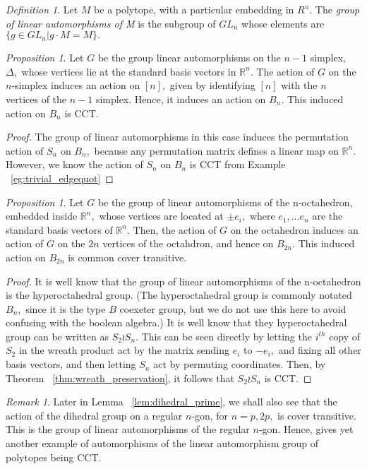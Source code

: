 \documentclass[10 pt]{amsart}
\theoremstyle{plain}
\theoremstyle{definition}
\theoremstyle{remark}
\numberwithin{equation}{section}
\newtheorem{prop}[thm]{Proposition}
\theoremstyle{remark}
\newtheorem{rem}[thm]{Remark}
\newtheorem{defn}[thm]{Definition}
\newcommand\BR{{\mathbb R}}
\begin{document}
\begin{defn}
Let $M$ be a polytope, with a particular embedding in $R^n.$ The {\it group of linear automorphisms of M} is the subgroup of $GL_n$ whose elements are $\{g \in GL_n|g \cdot M = M\}.$
\end{defn}

\begin{prop}
Let $G$ be the group linear automorphisms on the $n-1$ simplex, $\Delta,$ whose vertices lie at the standard basis vectors in $\BR^n.$ The action of $G$ on the $n$-simplex induces an action on $[n],$ given by identifying $[n]$ with the $n$ vertices of the $n-1$ simplex. Hence, it induces an action on $B_n.$ This induced action on $B_n$ is CCT.
\end{prop}
\begin{proof}
The group of linear automorphisms in this case induces the permutation action of $S_n$ on $B_n,$ because any permutation matrix defines a linear map on $\BR^n.$ However, we know the action of $S_n$ on $B_n$ is CCT from Example ~\ref{eg:trivial_edgequot}
\end{proof}

\begin{prop}
Let $G$ be the group of linear automorphisms of the n-octahedron, embedded inside $\BR^n,$ whose vertices are located at $\pm e_i,$ where $e_1,\ldots e_n$ are the standard basis vectors of $\BR^n.$ Then, the action of $G$ on the octahedron induces an action of $G$ on the $2n$ vertices of the octahdron, and hence on $B_{2n}.$ This induced action on $B_{2n}$ is common cover transitive. 
\end{prop}
\begin{proof}
It is well know that the group of linear automorphisms of the n-octahedron is the hyperoctahedral group. (The hyperoctahedral group is commonly notated $B_n,$ since it is the type $B$ coexeter group, but we do not use this here to avoid confusing with the boolean algebra.) It is well know that they hyperoctahedral group can be written as $S_2 \wr S_n.$ This can be seen directly by letting the $i^{th}$ copy of $S_2$ in the wreath product act by the matrix sending $e_i$ to $-e_i,$ and fixing all other basis vectors, and then letting $S_n$ act by permuting coordinates. Then, by Theorem ~\ref{thm:wreath_preservation}, it follows that $S_2 \wr S_n$ is CCT.
\end{proof}

\begin{rem}
Later in Lemma ~\ref{lem:dihedral_prime}, we shall also see that the action of the dihedral group on a regular $n$-gon, for $n = p,2p,$ is cover transitive. This is the group of linear automorphisms of the regular $n$-gon. Hence, gives yet another example of automorphisms of the linear automorphism group of  polytopes being CCT.
\end{rem}
\end{document}
